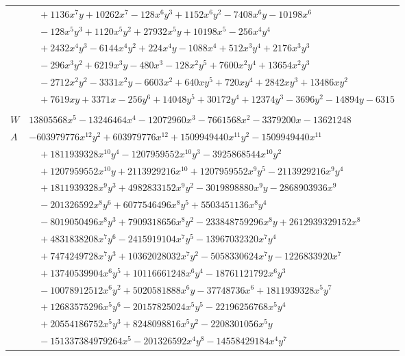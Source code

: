 \documentclass[11pt]{article}
\begin{document}
\begin{longtable}{@{}ll@{}}
 & $\quad +1136x^{7}y+10262x^{7}-128x^{6}y^{3}+1152x^{6}y^{2}-7408x^{6}y-10198x^{6}$\\
 & $\quad -128x^{5}y^{3}+1120x^{5}y^{2}+27932x^{5}y+10198x^{5}-256x^{4}y^{4}$\\
 & $\quad +2432x^{4}y^{3}-6144x^{4}y^{2}+224x^{4}y-1088x^{4}+512x^{3}y^{4}+2176x^{3}y^{3}$\\
 & $\quad -296x^{3}y^{2}+6219x^{3}y-480x^{3}-128x^{2}y^{5}+7600x^{2}y^{4}+13654x^{2}y^{3}$\\
 & $\quad -2712x^{2}y^{2}-3331x^{2}y-6603x^{2}+640xy^{5}+720xy^{4}+2842xy^{3}+13486xy^{2}$\\
 & $\quad +7619xy+3371x-256y^{6}+14048y^{5}+30172y^{4}+12374y^{3}-3696y^{2}-14894y-6315$\\
\addlinespace[3pt]
\multicolumn{2}{@{}l}{$i=17$, $m=768$, neighbours $45,4,5,7,9,10,15,25,29,30,32,40,41$}\\
$W$ & $13805568x^{5}-13246464x^{4}-12072960x^{3}-7661568x^{2}-3379200x-13621248$\\
$A$ & $-603979776x^{12}y^{2}+603979776x^{12}+1509949440x^{11}y^{2}-1509949440x^{11}$\\
 & $\quad +1811939328x^{10}y^{4}-1207959552x^{10}y^{3}-3925868544x^{10}y^{2}$\\
 & $\quad +1207959552x^{10}y+2113929216x^{10}+1207959552x^{9}y^{5}-2113929216x^{9}y^{4}$\\
 & $\quad +1811939328x^{9}y^{3}+4982833152x^{9}y^{2}-3019898880x^{9}y-2868903936x^{9}$\\
 & $\quad -201326592x^{8}y^{6}+6077546496x^{8}y^{5}+5503451136x^{8}y^{4}$\\
 & $\quad -8019050496x^{8}y^{3}+7909318656x^{8}y^{2}-233848759296x^{8}y+2612939329152x^{8}$\\
 & $\quad +4831838208x^{7}y^{6}-2415919104x^{7}y^{5}-13967032320x^{7}y^{4}$\\
 & $\quad +7474249728x^{7}y^{3}+10362028032x^{7}y^{2}-5058330624x^{7}y-1226833920x^{7}$\\
 & $\quad +13740539904x^{6}y^{5}+10116661248x^{6}y^{4}-18761121792x^{6}y^{3}$\\
 & $\quad -10078912512x^{6}y^{2}+5020581888x^{6}y-37748736x^{6}+1811939328x^{5}y^{7}$\\
 & $\quad +12683575296x^{5}y^{6}-20157825024x^{5}y^{5}-22196256768x^{5}y^{4}$\\
 & $\quad +20554186752x^{5}y^{3}+8248098816x^{5}y^{2}-2208301056x^{5}y$\\
 & $\quad -151337384979264x^{5}-201326592x^{4}y^{8}-14558429184x^{4}y^{7}$\\

\end{longtable}
\end{document}
